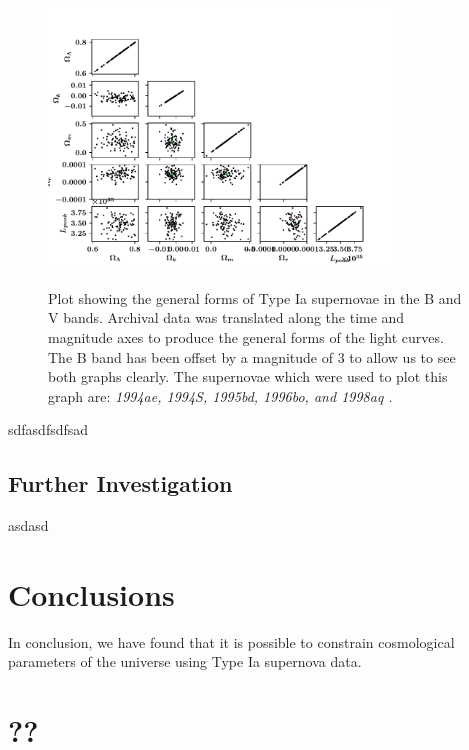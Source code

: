 \documentclass[twocolumn]{revtex4}
\begin{document}
\begin{figure}[!h]
\begin{center}
\includegraphics[width=9.25cm]{results/triangle}
\caption[]{Plot showing the general forms of Type Ia supernovae in the B and V bands. Archival data was translated along the time and magnitude axes to produce the general forms of the light curves. The B band has been offset by a magnitude of $3$ to allow us to see both graphs clearly. The supernovae which were used to plot this graph are: \em{1994ae, 1994S, 1995bd, 1996bo, }\em  and \em{1998aq }\em \cite{jha, matheson}. }
\vspace{-3ex}
\label{fig:triangle}
\end{center}
\end{figure}


sdfasdfsdfsad

\vspace{-3ex}
\subsection{Further Investigation} 
\vspace{-2ex}

asdasd

\vspace{-5ex}
\section{Conclusions}
\vspace{-2ex}

In conclusion, we have found that it is possible to constrain cosmological parameters of the universe using Type Ia supernova data.

\vspace{-3ex}



\clearpage
\appendix

\vfill
\twocolumngrid
\vspace{-3ex}
\section{??}
\vspace{-2ex}



\clearpage
\end{document}
